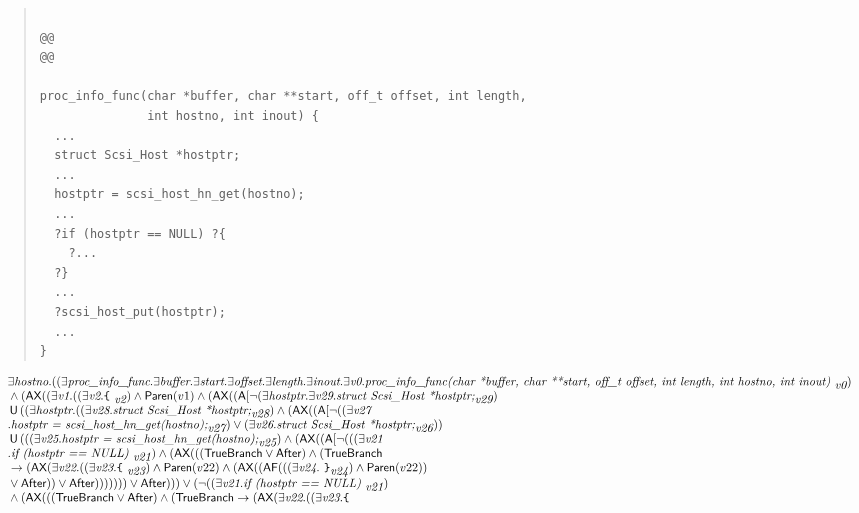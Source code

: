 \documentclass{article}
\newcommand{\U}{\,\mbox{\sf{U}}\,}
\newcommand{\A}{\mbox{\sf{A}}}
\newcommand{\AX}{\mbox{\sf{AX}}}
\newcommand{\AF}{\mbox{\sf{AF}}}
\newcommand{\mita}[1]{\mbox{\it{{#1}}}}
\newcommand{\msf}[1]{\mbox{\sf{{#1}}}}
\newcommand{\ttlb}{\mbox{\tt \char'173}}
\newcommand{\ttrb}{\mbox{\tt \char'175}}
\begin{document}
\begin{quote}\begin{verbatim}

@@
@@

proc_info_func(char *buffer, char **start, off_t offset, int length,
               int hostno, int inout) {
  ...
  struct Scsi_Host *hostptr;
  ...
  hostptr = scsi_host_hn_get(hostno);
  ...
  ?if (hostptr == NULL) ?{
    ?...
  ?}
  ...
  ?scsi_host_put(hostptr);
  ...
}
\end{verbatim}\end{quote}

\[\begin{array}{l}
\exists \mita{hostno} . ((\exists \mita{proc\_info\_func} . \exists \mita{buffer} . \exists \mita{start} . \exists \mita{offset} . \exists \mita{length} . \exists \mita{inout} . \exists \mita{v0} . \mita{proc\_info\_func(char *buffer, char **start, off\_t offset, int length,
               int hostno, int inout) }_{\mita{v0}})\\\mbox{} \wedge (\AX((\exists \mita{v1} . ((\exists \mita{v2} . \mita{{\ttlb}
  }_{\mita{v2}}) \wedge \msf{Paren}(v1) \wedge (\AX((\A[\neg (\exists \mita{hostptr} . \exists \mita{v29} . \mita{struct Scsi\_Host *hostptr;}_{\mita{v29}})\\\mbox{} \U ((\exists \mita{hostptr} . ((\exists \mita{v28} . \mita{struct Scsi\_Host *hostptr;}_{\mita{v28}}) \wedge (\AX((\A[\neg ((\exists \mita{v27}\\\mbox{} . \mita{hostptr = scsi\_host\_hn\_get(hostno);}_{\mita{v27}}) \vee (\exists \mita{v26} . \mita{struct Scsi\_Host *hostptr;}_{\mita{v26}}))\\\mbox{} \U (((\exists \mita{v25} . \mita{hostptr = scsi\_host\_hn\_get(hostno);}_{\mita{v25}}) \wedge (\AX((\A[\neg (((\exists \mita{v21}\\\mbox{} . \mita{if (hostptr == NULL) }_{\mita{v21}}) \wedge (\AX(((\msf{TrueBranch} \vee \msf{After}) \wedge (\msf{TrueBranch}\\\mbox{} \rightarrow (\AX(\exists \mita{v22} . ((\exists \mita{v23} . \mita{{\ttlb}
  }_{\mita{v23}}) \wedge \msf{Paren}(v22) \wedge (\AX((\AF(((\exists \mita{v24} . \mita{
{\ttrb}}_{\mita{v24}}) \wedge \msf{Paren}(v22))\\\mbox{} \vee \msf{After})) \vee \msf{After}))))))) \vee \msf{After}))) \vee (\neg ((\exists \mita{v21} . \mita{if (hostptr == NULL) }_{\mita{v21}})\\\mbox{} \wedge (\AX(((\msf{TrueBranch} \vee \msf{After}) \wedge (\msf{TrueBranch} \rightarrow (\AX(\exists \mita{v22} . ((\exists \mita{v23} . \mita{{\ttlb}
}
\end{array}\]
\end{document}
